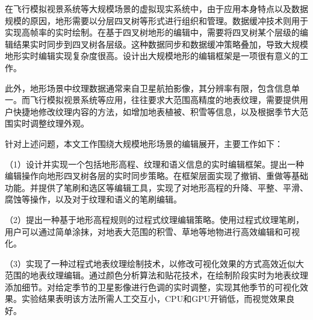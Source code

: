 
\begin{cabstract}
	在飞行模拟视景系统等大规模场景的虚拟现实系统中，由于应用本身特点以及数据规模的原因，地形需要以分层四叉树等形式进行组织和管理。数据缓冲技术则用于实现高帧率的实时绘制。在基于四叉树地形的编辑中，需要将四叉树某个层级的编辑结果实时同步到四叉树各层级。这种数据同步和数据缓冲策略叠加，导致大规模地形实时编辑实现复杂度很高。设计出大规模地形的编辑框架是一项很有意义的工作。\par
	此外，地形场景中纹理数据通常来自卫星航拍影像，其分辨率有限，包含信息单一。而飞行模拟视景系统等应用，往往要求大范围高精度的地表纹理，需要提供用户快捷地修改纹理内容的方法，如增加地表植被、积雪等信息，以及根据季节大范围实时调整纹理外观。\par
	针对上述问题，本文工作围绕大规模地形场景的编辑展开，主要工作如下：\par
	（1）设计并实现一个包括地形高程、纹理和语义信息的实时编辑框架。提出一种编辑操作向地形四叉树各层的实时同步策略。在框架层面实现了撤销、重做等基础功能。并提供了笔刷和选区等编辑工具，实现了对地形高程的升降、平整、平滑、腐蚀等操作，以及对于纹理和语义的笔刷编辑。\par
	（2）提出一种基于地形高程规则的过程式纹理编辑策略。使用过程式纹理笔刷，用户可以通过简单涂抹，对地表大范围的积雪、草地等地物进行高效编辑和可视化。\par
	（3）实现了一种过程式地表纹理绘制技术，以修改可视化效果的方式高效近似大范围的地表纹理编辑。通过颜色分析算法和贴花技术，在绘制阶段实时为地表纹理添加细节。对给定季节的卫星影像进行色调的实时调整，实现其他季节的可视化效果。实验结果表明该方法所需人工交互小，CPU和GPU开销低，而视觉效果良好。\par

\end{cabstract}
\cleardoublepage
